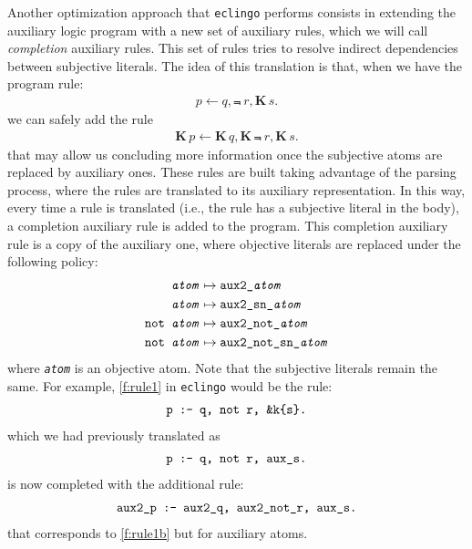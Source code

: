 \documentclass{new_tlp}
\def\K{\mathbf{K}\, }
\let\sneg\relax
\newcommand{\sneg}{\ensuremath{\text{-}}}
\def\eclingo{{\tt eclingo}}
\begin{document}
Another optimization approach that \eclingo{} performs consists in extending the auxiliary logic program with a new set of auxiliary rules, which we will call \emph{completion} auxiliary rules. This set of rules tries to resolve indirect dependencies between subjective literals.
The idea of this translation is that, when we have the program rule:
\begin{eqnarray}
p \leftarrow q, \Not \ r, \K s.\label{f:rule1}
\end{eqnarray}
we can safely add the rule
\begin{eqnarray}
\K p \leftarrow \K q, \K \Not \ r, \K s. \label{f:rule1b}
\end{eqnarray}
that may allow us concluding more information once the subjective atoms are replaced by auxiliary ones.
These rules are built taking advantage of the parsing process, where the rules are translated to its auxiliary representation. In this way, every time a rule is translated (i.e., the rule has a subjective literal in the body), a completion auxiliary rule is added to the program. This completion auxiliary rule is a copy of the auxiliary one, where objective literals are replaced under the following policy:
\begin{align*}
    \texttt{\emph{atom}} & \mapsto \texttt{aux2\_\emph{atom}} \\
    \texttt{\sneg\emph{atom}} & \mapsto \texttt{aux2\_sn\_\emph{atom}} \\
    \texttt{not \emph{atom}} & \mapsto \texttt{aux2\_not\_\emph{atom}} \\
    \texttt{not \sneg\emph{atom}} & \mapsto \texttt{aux2\_not\_sn\_\emph{atom}}
\end{align*}
where \texttt{\emph{atom}} is an objective atom. Note that the subjective literals remain the same. For example, \eqref{f:rule1} in \eclingo{} would be the rule:
\begin{align*}
    \texttt{p\text{ \texttt{:-}} q,\ not\ r,\ \&k\{s\}.}
\end{align*}
which we had previously translated as
\begin{align*}
    \texttt{p\text{ \texttt{:-}} q,\ not\ r,\ aux\_s.}
\end{align*}
is now completed with the additional rule:
\begin{align*}
    \texttt{aux2\_p\text{ \texttt{:-}} aux2\_q,\ aux2\_not\_r,\ aux\_s.}
\end{align*}
that corresponds to \eqref{f:rule1b} but for auxiliary atoms.
\end{document}
